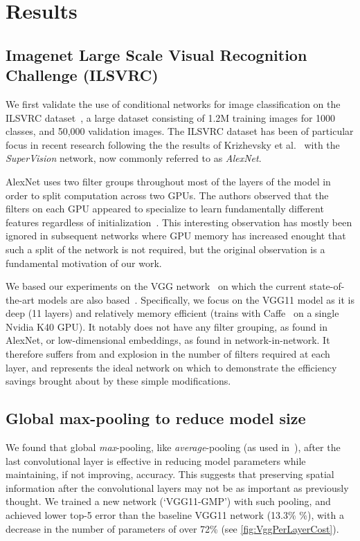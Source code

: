 \documentclass[thesis]{subfiles}
\begin{document}
	\section{Results}
	
	\subsection{Imagenet Large Scale Visual Recognition Challenge (ILSVRC)}
	We first validate the use of conditional networks for image classification on the ILSVRC dataset~\citep{ILSVRC2015}, a large dataset consisting of 1.2M training images for 1000 classes, and 50,000 validation images. The ILSVRC dataset has been of particular focus in recent research following the the results of Krizhevsky et al.~\citep{Krizhevsky2012} with the \emph{SuperVision} network, now commonly referred to as \emph{AlexNet}.
	
	AlexNet uses two filter groups throughout most of the layers of the model in order to split computation across two GPUs. The authors observed that the filters on each GPU appeared to specialize to learn fundamentally different features regardless of initialization~\citep{Krizhevsky2012}. This interesting observation has mostly been ignored in subsequent networks where GPU memory has increased enought that such a split of the network is not required, but the original observation is a fundamental motivation of our work.
	
	We based our experiments on the VGG network~\citep{Simonyan2014verydeep} on which the current state-of-the-art models are also based~\citep{He2015b}. Specifically, we focus on the VGG11 model as it is deep (11 layers) and relatively memory efficient (trains with Caffe~\citep{Jia2014} on a single Nvidia K40 GPU). It notably does not have any filter grouping, as found in AlexNet, or low-dimensional embeddings, as found in network-in-network. It therefore suffers from and explosion in the number of filters required at each layer, and represents the ideal network on which to demonstrate the efficiency savings brought about by these simple modifications.
	
	\subsection{Global max-pooling to reduce model size}
	We found that global {\em max}-pooling, like 
	{\em average}-pooling (as used in~\citep{Lin2013NiN,Szegedy2014going}), after the last convolutional layer is effective in reducing model parameters while maintaining, if not improving, accuracy. This suggests that preserving spatial information after the convolutional layers may not be as important as previously thought. 
	We trained a new network (`VGG11-GMP') with such pooling, and achieved lower top-5 error than the baseline VGG11 
	network (13.3\% \%), with a decrease in the number of parameters of over 72\% (see \cref{fig:VggPerLayerCost}).
	
\end{document}
